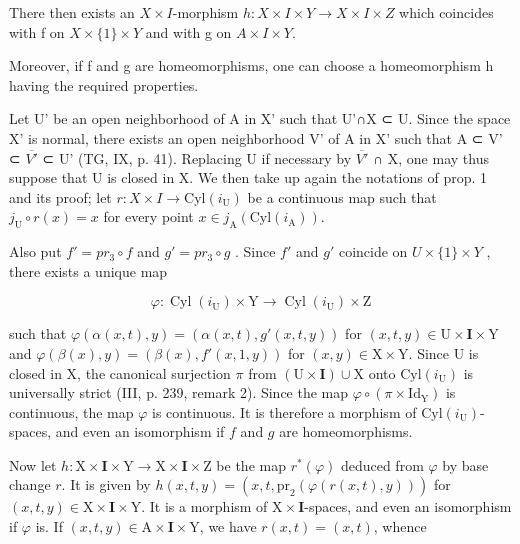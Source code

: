 There then exists an \(X \times I\)-morphism \(h: X \times I \times Y \to X \times I \times Z\) which coincides with f on \(X \times \{1\} \times Y\) and with g on \(A \times I \times Y\).

Moreover, if f and g are homeomorphisms, one can choose a homeomorphism h having the required properties.

Let U' be an open neighborhood of A in X' such that U'∩X ⊂ U. Since the space X' is normal, there exists an open neighborhood V' of A in X' such that A ⊂ V' ⊂ \(\overline{V'}\) ⊂ U' (TG, IX, p. 41). Replacing U if necessary by \(\overline{V'}\) ∩ X, one may thus suppose that U is closed in X. We then take up again the notations of prop. 1 and its proof; let \(r: X \times I \to \text{Cyl}(i_{\text{U}})\) be a continuous map such that \(j_{\text{U}} \circ r(x) = x\) for every point \(x \in j_{\text{A}}(\text{Cyl}(i_{\text{A}}))\).

Also put \(f' = pr_{3} \circ f\) and \(g' = pr_{3} \circ g\) . Since \(f'\) and \(g'\) coincide on \(U \times \{1\} \times Y\) , there exists a unique map

\[
\varphi \colon \operatorname{Cyl} (i _ {\mathrm{U}}) \times \mathrm{Y} \to \operatorname{Cyl} (i _ {\mathrm{U}}) \times \mathrm{Z}
\]

such that \(\varphi(\alpha(x,t),y) = (\alpha(x,t),g'(x,t,y))\) for \((x,t,y) \in \mathrm{U} \times \mathbf{I} \times \mathrm{Y}\) and \(\varphi(\beta(x),y) = (\beta(x),f'(x,1,y))\) for \((x,y) \in \mathrm{X} \times \mathrm{Y}\). Since U is closed in X, the canonical surjection \(\pi\) from \((\mathrm{U} \times \mathbf{I}) \cup \mathrm{X}\) onto \(\mathrm{Cyl}(i_{\mathrm{U}})\) is universally strict (III, p. 239, remark 2). Since the map \(\varphi \circ (\pi \times \mathrm{Id}_{\mathrm{Y}})\) is continuous, the map \(\varphi\) is continuous. It is therefore a morphism of \(\mathrm{Cyl}(i_{\mathrm{U}})\)-spaces, and even an isomorphism if \(f\) and \(g\) are homeomorphisms.

Now let \(h \colon \mathrm{X} \times \mathbf{I} \times \mathrm{Y} \to \mathrm{X} \times \mathbf{I} \times \mathrm{Z}\) be the map \(r^*(\varphi)\) deduced from \(\varphi\) by base change \(r\). It is given by \(h(x,t,y) = (x,t,\mathrm{pr}_2(\varphi(r(x,t),y)))\) for \((x,t,y) \in \mathrm{X} \times \mathbf{I} \times \mathrm{Y}\). It is a morphism of \(\mathrm{X} \times \mathbf{I}\)-spaces, and even an isomorphism if \(\varphi\) is. If \((x,t,y) \in \mathrm{A} \times \mathbf{I} \times \mathrm{Y}\), we have \(r(x,t) = (x,t)\), whence

